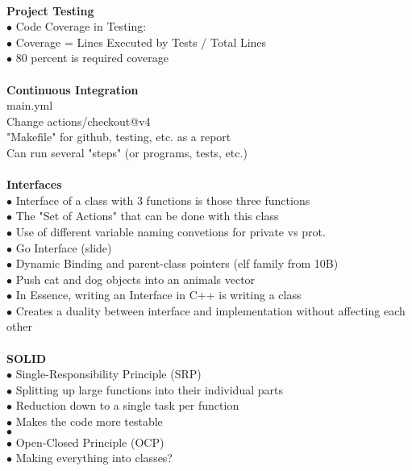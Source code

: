 \documentclass[11pt]{article}
\begin{document}
\\
\textbf{Project Testing}\\
\indent $\bullet$ Code Coverage in Testing:\\
\indent $\bullet$ Coverage = Lines Executed by Tests / Total Lines\\
\indent $\bullet$ 80 percent is required coverage \\
\\
\textbf{Continuous Integration}\\
\indent main.yml\\
\indent Change actions/checkout@v4\\
\indent "Makefile" for github, testing, etc. as a report\\
\indent Can run several "steps" (or programs, tests, etc.)\\
\\
\textbf{Interfaces}\\
\indent $\bullet$ Interface of a class with 3 functions is those three functions \\
\indent $\bullet$ The "Set of Actions" that can be done with this class \\
\indent $\bullet$ Use of different variable naming convetions for private vs prot. \\
\indent $\bullet$ Go Interface (slide) \\
\indent $\bullet$ Dynamic Binding and parent-class pointers (elf family from 10B) \\
\indent $\bullet$ Push cat and dog objects into an animals vector \\
\indent $\bullet$ In Essence, writing an Interface in C++ is writing a class \\
\indent $\bullet$ Creates a duality between interface and implementation without affecting each other \\
\\
\textbf{SOLID} \\
\indent $\bullet$ Single-Responsibility Principle (SRP) \\
\indent\indent $\bullet$ Splitting up large functions into their individual parts \\
\indent\indent $\bullet$ Reduction down to a single task per function \\
\indent\indent $\bullet$ Makes the code more testable \\
\indent\indent $\bullet$  \\
\indent $\bullet$ Open-Closed Principle (OCP) \\
\indent\indent $\bullet$ Making everything into classes? \\
\end{document}
